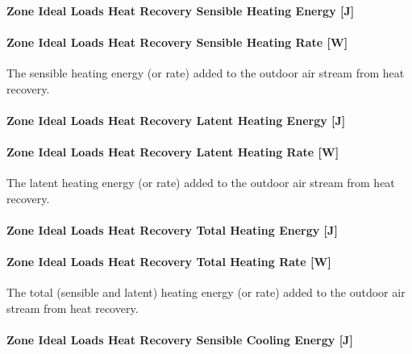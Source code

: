 \paragraph{Zone Ideal Loads Heat Recovery Sensible Heating Energy {[}J{]}}\label{zone-ideal-loads-heat-recovery-sensible-heating-energy-j}

\paragraph{Zone Ideal Loads Heat Recovery Sensible Heating Rate {[}W{]}}\label{zone-ideal-loads-heat-recovery-sensible-heating-rate-w}

The sensible heating energy (or rate) added to the outdoor air stream from heat recovery.

\paragraph{Zone Ideal Loads Heat Recovery Latent Heating Energy {[}J{]}}\label{zone-ideal-loads-heat-recovery-latent-heating-energy-j}

\paragraph{Zone Ideal Loads Heat Recovery Latent Heating Rate {[}W{]}}\label{zone-ideal-loads-heat-recovery-latent-heating-rate-w}

The latent heating energy (or rate) added to the outdoor air stream from heat recovery.

\paragraph{Zone Ideal Loads Heat Recovery Total Heating Energy {[}J{]}}\label{zone-ideal-loads-heat-recovery-total-heating-energy-j}

\paragraph{Zone Ideal Loads Heat Recovery Total Heating Rate {[}W{]}}\label{zone-ideal-loads-heat-recovery-total-heating-rate-w}

The total (sensible and latent) heating energy (or rate) added to the outdoor air stream from heat recovery.

\paragraph{Zone Ideal Loads Heat Recovery Sensible Cooling Energy {[}J{]}}\label{zone-ideal-loads-heat-recovery-sensible-cooling-energy-j}

